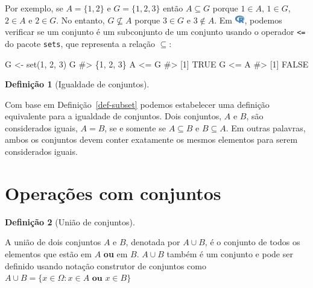 \documentclass[
  letterpaper,
]{book}
\newenvironment{Shaded}{\begin{snugshade}}{\end{snugshade}}
\newcommand{\CommentTok}[1]{\textcolor[rgb]{0.37,0.37,0.37}{#1}}
\newcommand{\DecValTok}[1]{\textcolor[rgb]{0.68,0.00,0.00}{#1}}
\newcommand{\FunctionTok}[1]{\textcolor[rgb]{0.28,0.35,0.67}{#1}}
\newcommand{\NormalTok}[1]{\textcolor[rgb]{0.00,0.23,0.31}{#1}}
\newcommand{\OtherTok}[1]{\textcolor[rgb]{0.00,0.23,0.31}{#1}}
\newcommand{\SpecialCharTok}[1]{\textcolor[rgb]{0.37,0.37,0.37}{#1}}
\theoremstyle{plain}
\theoremstyle{definition}
\newtheorem{definition}{Definição}[chapter]
\theoremstyle{remark}
\begin{document}
Por exemplo, se \(A = \{ 1 , 2 \}\) e \(G = \{ 1, 2, 3\}\) então
\(A \subseteq G\) porque \(1 \in A\), \(1 \in G\), \(2 \in A\) e
\(2 \in G\). No entanto, \(G \nsubseteq A\) porque \(3 \in G\) e
\(3 \notin A\). Em
\includegraphics[width=1.13em,height=1em]{naive_set_theory_files/figure-pdf/fa-icon-9b00320707d42527dde67262afb33ded.pdf},
podemos verificar se um conjunto é um subconjunto de um conjunto usando
o operador \texttt{\textless{}=} do pacote \texttt{sets}, que representa
a relação \(\subseteq\):

\begin{Shaded}
\begin{Highlighting}[]
\NormalTok{G }\OtherTok{\textless{}{-}} \FunctionTok{set}\NormalTok{(}\DecValTok{1}\NormalTok{, }\DecValTok{2}\NormalTok{, }\DecValTok{3}\NormalTok{)}
\NormalTok{G}
\CommentTok{\#\textgreater{} \{1, 2, 3\}}
\NormalTok{A }\SpecialCharTok{\textless{}=}\NormalTok{ G}
\CommentTok{\#\textgreater{} [1] TRUE}
\NormalTok{G }\SpecialCharTok{\textless{}=}\NormalTok{ A}
\CommentTok{\#\textgreater{} [1] FALSE}
\end{Highlighting}
\end{Shaded}

\begin{definition}[Igualdade de
conjuntos]\protect\hypertarget{def-set-equality}{}\label{def-set-equality}

Com base em Definição~\ref{def-subset} podemos estabelecer uma definição
equivalente para a igualdade de conjuntos. Dois conjuntos, \(A\) e
\(B\), são considerados iguais, \(A = B\), se e somente se
\(A \subseteq B\) e \(B \subseteq A\). Em outras palavras, ambos os
conjuntos devem conter exatamente os mesmos elementos para serem
considerados iguais.

\end{definition}

\section{Operações com conjuntos}\label{operauxe7uxf5es-com-conjuntos}

\begin{definition}[União de
conjuntos]\protect\hypertarget{def-union}{}\label{def-union}

A união de dois conjuntos \(A\) e \(B\), denotada por \(A \cup B\), é o
conjunto de todos os elementos que estão em \(A\) \textbf{ou} em \(B\).
\(A \cup B\) também é um conjunto e pode ser definido usando notação
construtor de conjuntos como
\(A \cup B = \{x \in \Omega : x \in A \textbf{ ou } x \in B \}\)

\end{definition}
\end{document}
